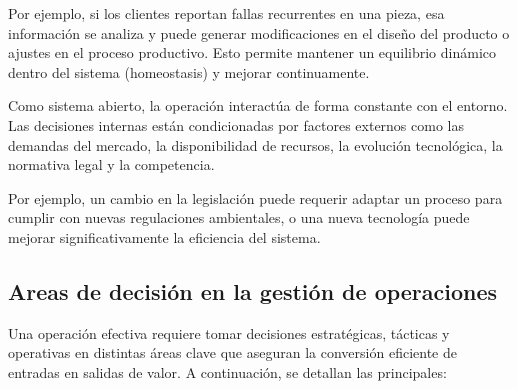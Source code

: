 \documentclass[a4paper,oneside,11pt]{article}
\begin{document}
    Por ejemplo, si los clientes reportan fallas recurrentes en una pieza, esa información se analiza y puede generar modificaciones en el diseño del producto o ajustes en el proceso productivo. Esto permite mantener un equilibrio dinámico dentro del sistema (homeostasis) y mejorar continuamente.
    
    Como sistema abierto, la operación interactúa de forma constante con el entorno. Las decisiones internas están condicionadas por factores externos como las demandas del mercado, la disponibilidad de recursos, la evolución tecnológica, la normativa legal y la competencia.
    
    Por ejemplo, un cambio en la legislación puede requerir adaptar un proceso para cumplir con nuevas regulaciones ambientales, o una nueva tecnología puede mejorar significativamente la eficiencia del sistema.

\subsection{Areas de decisión en la gestión de operaciones}

Una operación efectiva requiere tomar decisiones estratégicas, tácticas y operativas en distintas áreas clave que aseguran la conversión eficiente de entradas en salidas de valor. A continuación, se detallan las principales:
\end{document}
